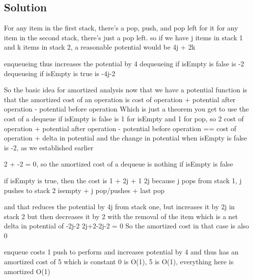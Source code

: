 \subsection*{Solution}

For any item in the first stack, there's a pop, push, and pop left for it
for any item in the second stack, there's just a pop left.
so if we have j items in stack 1 and k items in stack 2, a reasonable potential would be 4j + 2k

enqueueing thus increases the potential by 4
dequeueing if isEmpty is false is -2
dequeueing if isEmpty is true is -4j-2

So the basic idea for amortized analysis now that we have a potential function is that the amortized cost of an operation is cost of operation + potential after operation - potential before operation
Which is just a theorem you get to use
the cost of a dequeue if isEmpty is false is 1 for isEmpty and 1 for pop, so 2
cost of operation + potential after operation - potential before operation == cost of operation + delta in potential
and the change in potential when isEmpty is false is -2, as we established earlier

2 + -2 = 0, so the amortized cost of a dequeue is nothing if isEmpty is false

if isEmpty is true, then the cost is 1 + 2j + 1 
2j because j pops from stack 1, j pushes to stack 2
isempty + j pop/pushes + last pop

and that reduces the potential by 4j from stack one, but increases it by 2j in stack 2
but then decreases it by 2 with the removal of the item
which is a net delta in potential of -2j-2
2j+2-2j-2 = 0
So the amortized cost in that case is also 0

enqueue costs 1 push to perform
and increases potential by 4
and thus has an amortized cost of 5
which is constant
0 is O(1), 5 is O(1), everything here is amortized O(1)

